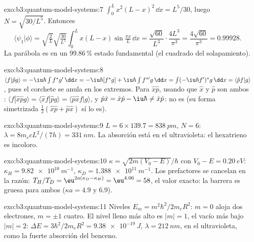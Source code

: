 \begin{solution}{exo:b3:quantum-model-systems:7}
$\int_0^Lx^2(L - x)^2\,\dd x = L^5/30$, luego $N = \sqrt{30/L^5}$. Entonces
\[
\langle\psi_1|\phi\rangle = \sqrt{\tfrac2L}\sqrt{\tfrac{30}{L^5}}\int_0^Lx(L -
x)\sin\tfrac{\pi x}{L}\,\dd x = \frac{\sqrt{60}}{L^3}\cdot\frac{4L^3}{\pi^3} =
\frac{4\sqrt{60}}{\pi^3} = 0.99928 .
\]
La parábola es en un 99.86\,\% estado fundamental (el cuadrado del solapamiento).
\end{solution}

\begin{solution}{exo:b3:quantum-model-systems:8}
$\langle f|\hat pg\rangle = -\iu\hbar\int f^*g'\,\dd x = -\iu\hbar[f^*g] +
\iu\hbar\int f^{*\prime}g\,\dd x = \int(-\iu\hbar f')^*g\,\dd x = \langle\hat
pf|g\rangle$, pues el corchete se anula en los extremos. Para $\hat x\hat p$, usando que $\hat x$ y $\hat p$ son ambos :
$\langle f|\hat x\hat pg\rangle = \langle\hat xf|\hat pg\rangle = \langle\hat p\hat
xf|g\rangle$, y $\hat p\hat x = \hat x\hat p - \iu\hbar \ne \hat x\hat p$: no es
 (su forma simetrizada $\frac12(\hat x\hat p + \hat p\hat x)$ sí lo es).
\end{solution}

\begin{solution}{exo:b3:quantum-model-systems:9}
$L = 6 \times 139.7 = \qty{838}{pm}$, $N = 6$: $\lambda = 8m_ecL^2/(7h) =
\qty{331}{nm}$. La absorción está en el ultravioleta: el hexatrieno es
incoloro.
\end{solution}

\begin{solution}{exo:b3:quantum-model-systems:10}
$\kappa = \sqrt{2m(V_0 - E)}/\hbar$ con $V_0 - E = \qty{0.20}{eV}$:
$\kappa_H = \qty{9.82e10}{m^{-1}}$, $\kappa_D = \qty{1.388e11}{m^{-1}}$. Los
prefactores se cancelan en la razón: $T_H/T_D = \eu^{2a(\kappa_D - \kappa_H)} =
\eu^{4.06} = 58$, el valor exacto: la barrera es gruesa para ambos
($\kappa a = 4.9$ y 6.9).
\end{solution}

\begin{solution}{exo:b3:quantum-model-systems:11}
Niveles $E_m = m^2\hbar^2/2m_eR^2$: $m = 0$ aloja dos electrones, $m = \pm1$
cuatro. El nivel lleno más alto es $|m| = 1$, el vacío más bajo $|m| = 2$: $\Delta E =
3\hbar^2/2m_eR^2 = \qty{9.38e-19}{J}$, $\lambda = \qty{212}{nm}$, en el
ultravioleta, como la fuerte absorción del benceno.
\end{solution}

